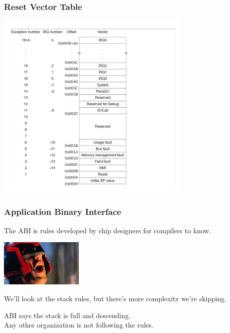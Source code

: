 \begin{frame}
\frametitle{Reset Vector Table}

\begin{center}
	\includegraphics[width=0.7\textwidth]{images/rvtable.png}
\end{center}

\end{frame}


\begin{frame}
\frametitle{Application Binary Interface}

The ABI is rules developed by chip designers for compilers to know.

\begin{center}
	\includegraphics[width=0.3\textwidth]{images/thelaw.jpg}
\end{center}

We'll look at the stack rules, but there's more complexity we're skipping.

ABI says the stack is full and descending.\\
\quad Any other organization is not following the rules.

\end{frame}


